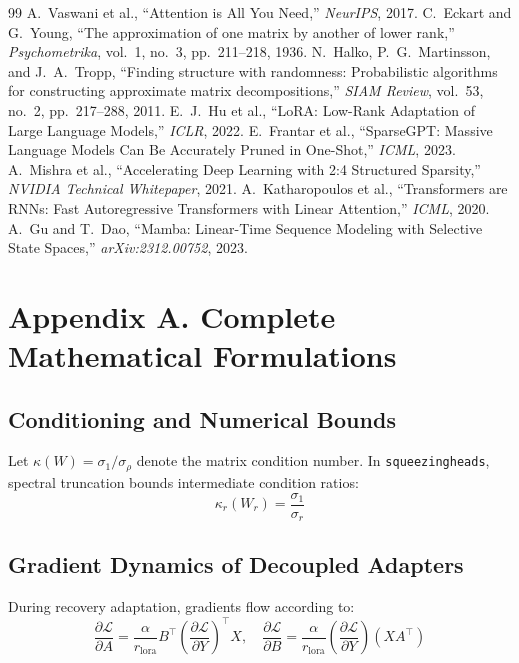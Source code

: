 \begin{thebibliography}{99}
 A.~Vaswani et al., ``Attention is All You Need,'' \emph{NeurIPS}, 2017.
 C.~Eckart and G.~Young, ``The approximation of one matrix by another of lower rank,'' \emph{Psychometrika}, vol.~1, no.~3, pp.~211--218, 1936.
 N.~Halko, P.~G.~Martinsson, and J.~A.~Tropp, ``Finding structure with randomness: Probabilistic algorithms for constructing approximate matrix decompositions,'' \emph{SIAM Review}, vol.~53, no.~2, pp.~217--288, 2011.
 E.~J.~Hu et al., ``LoRA: Low-Rank Adaptation of Large Language Models,'' \emph{ICLR}, 2022.
 E.~Frantar et al., ``SparseGPT: Massive Language Models Can Be Accurately Pruned in One-Shot,'' \emph{ICML}, 2023.
 A.~Mishra et al., ``Accelerating Deep Learning with 2:4 Structured Sparsity,'' \emph{NVIDIA Technical Whitepaper}, 2021.
 A.~Katharopoulos et al., ``Transformers are RNNs: Fast Autoregressive Transformers with Linear Attention,'' \emph{ICML}, 2020.
 A.~Gu and T.~Dao, ``Mamba: Linear-Time Sequence Modeling with Selective State Spaces,'' \emph{arXiv:2312.00752}, 2023.
\end{thebibliography}


\section*{Appendix A. Complete Mathematical Formulations}

\subsection*{Conditioning and Numerical Bounds}
Let $\kappa(W) = \sigma_1 / \sigma_\rho$ denote the matrix condition number. In \texttt{squeezingheads}, spectral truncation bounds intermediate condition ratios:
\[
\kappa_r(W_r) = \frac{\sigma_1}{\sigma_r}
\]

\subsection*{Gradient Dynamics of Decoupled Adapters}
During recovery adaptation, gradients flow according to:
\[
\frac{\partial \mathcal{L}}{\partial A} = \frac{\alpha}{r_{\text{lora}}} B^\top \left( \frac{\partial \mathcal{L}}{\partial Y} \right)^\top X, \quad \frac{\partial \mathcal{L}}{\partial B} = \frac{\alpha}{r_{\text{lora}}} \left( \frac{\partial \mathcal{L}}{\partial Y} \right) (X A^\top)
\]

